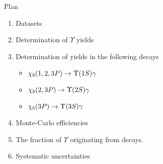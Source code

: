 \begin{frame}{Plan}
\begin{enumerate}
\item Datasets
\item Determination of $\Upsilon$ yields
\item Determination of \chib yields in the following decays
\begin{itemize}
    \item $\chi_b(1,2,3P) \to \OneS \gamma$
    \item $\chi_b(2,3P) \to \TwoS \gamma$
    \item $\chi_b(3P) \to \ThreeS \gamma$
\end{itemize}
\item Monte-Carlo efficiencies
\item The fraction of $\Upsilon$ originating from \chib decays.
\item Systematic uncertainties 
\end{enumerate}
\end{frame}
